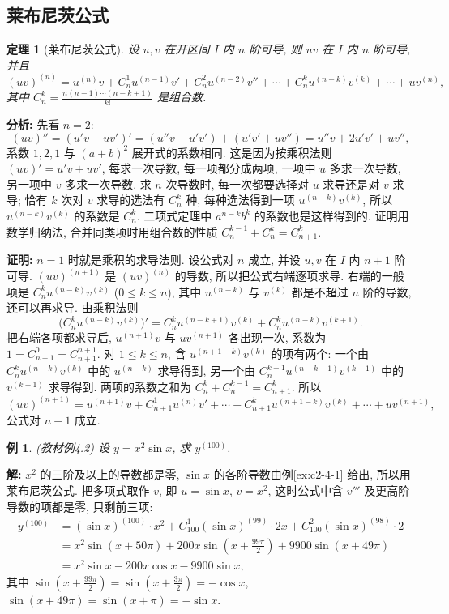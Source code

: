 \documentclass[UTF8,openany]{ctexbook}
\theoremstyle{chinesetextbook}
\newtheorem{example}{例}[section]
\newenvironment{cnproof}{\par\indent\textbf{证明:} \ignorespaces}{\par}
\newenvironment{cnsolution}{\par\indent\textbf{解:} \ignorespaces}{\par}
\newtheorem*{theoremsingle}{定理}
\begin{document}
\subsection{莱布尼茨公式}
\begin{theoremsingle}[莱布尼茨公式]
设 $u,v$ 在开区间 $I$ 内 $n$ 阶可导, 则 $uv$ 在 $I$ 内 $n$ 阶可导, 并且
\[
(uv)^{(n)}=u^{(n)}v+C_n^1u^{(n-1)}v'+C_n^2u^{(n-2)}v''+\cdots+C_n^ku^{(n-k)}v^{(k)}+\cdots+uv^{(n)},
\]
其中 $\displaystyle C_n^k=\frac{n(n-1)\cdots(n-k+1)}{k!}$ 是组合数.
\end{theoremsingle}
\par\indent\textbf{分析:} 先看 $n=2$:
\[
(uv)''=(u'v+uv')'=(u''v+u'v')+(u'v'+uv'')=u''v+2u'v'+uv'',
\]
系数 $1,2,1$ 与 $(a+b)^2$ 展开式的系数相同. 这是因为按乘积法则 $(uv)'=u'v+uv'$, 每求一次导数, 每一项都分成两项, 一项中 $u$ 多求一次导数, 另一项中 $v$ 多求一次导数. 求 $n$ 次导数时, 每一次都要选择对 $u$ 求导还是对 $v$ 求导; 恰有 $k$ 次对 $v$ 求导的选法有 $C_n^k$ 种, 每种选法得到一项 $u^{(n-k)}v^{(k)}$, 所以 $u^{(n-k)}v^{(k)}$ 的系数是 $C_n^k$. 二项式定理中 $a^{n-k}b^k$ 的系数也是这样得到的. 证明用数学归纳法, 合并同类项时用组合数的性质 $C_n^{k-1}+C_n^k=C_{n+1}^k$.
\begin{cnproof}
$n=1$ 时就是乘积的求导法则. 设公式对 $n$ 成立, 并设 $u,v$ 在 $I$ 内 $n+1$ 阶可导. $(uv)^{(n+1)}$ 是 $(uv)^{(n)}$ 的导数, 所以把公式右端逐项求导. 右端的一般项是 $C_n^ku^{(n-k)}v^{(k)}$ ($0\le k\le n$), 其中 $u^{(n-k)}$ 与 $v^{(k)}$ 都是不超过 $n$ 阶的导数, 还可以再求导. 由乘积法则
\[
\bigl(C_n^ku^{(n-k)}v^{(k)}\bigr)'=C_n^ku^{(n-k+1)}v^{(k)}+C_n^ku^{(n-k)}v^{(k+1)}.
\]
把右端各项都求导后, $u^{(n+1)}v$ 与 $uv^{(n+1)}$ 各出现一次, 系数为 $1=C_{n+1}^0=C_{n+1}^{n+1}$. 对 $1\le k\le n$, 含 $u^{(n+1-k)}v^{(k)}$ 的项有两个: 一个由 $C_n^ku^{(n-k)}v^{(k)}$ 中的 $u^{(n-k)}$ 求导得到, 另一个由 $C_n^{k-1}u^{(n-k+1)}v^{(k-1)}$ 中的 $v^{(k-1)}$ 求导得到. 两项的系数之和为 $C_n^k+C_n^{k-1}=C_{n+1}^k$. 所以
\[
(uv)^{(n+1)}=u^{(n+1)}v+C_{n+1}^1u^{(n)}v'+\cdots+C_{n+1}^ku^{(n+1-k)}v^{(k)}+\cdots+uv^{(n+1)},
\]
公式对 $n+1$ 成立.
\end{cnproof}
\begin{example}\label{ex:c2-4-2}
\textnormal{(教材例4.2)} 设 $y=x^2\sin x$, 求 $y^{(100)}$.
\end{example}
\begin{cnsolution}
$x^2$ 的三阶及以上的导数都是零, $\sin x$ 的各阶导数由例\ref{ex:c2-4-1} 给出, 所以用莱布尼茨公式. 把多项式取作 $v$, 即 $u=\sin x$, $v=x^2$, 这时公式中含 $v'''$ 及更高阶导数的项都是零, 只剩前三项:
\[
\begin{aligned}
y^{(100)}&=(\sin x)^{(100)}\cdot x^2+C_{100}^1(\sin x)^{(99)}\cdot2x+C_{100}^2(\sin x)^{(98)}\cdot2\\
&=x^2\sin(x+50\pi)+200x\sin\left(x+\frac{99\pi}2\right)+9900\sin(x+49\pi)\\
&=x^2\sin x-200x\cos x-9900\sin x,
\end{aligned}
\]
其中 $\displaystyle\sin\left(x+\frac{99\pi}2\right)=\sin\left(x+\frac{3\pi}2\right)=-\cos x$, $\sin(x+49\pi)=\sin(x+\pi)=-\sin x$.
\end{cnsolution}
\end{document}
